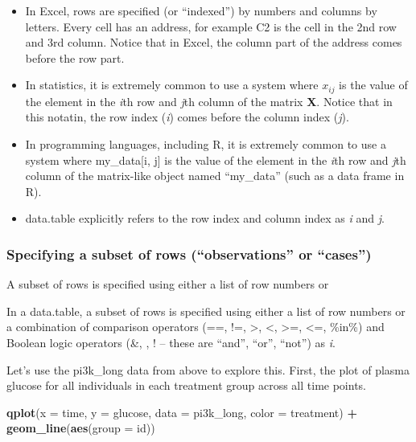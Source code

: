 \documentclass[]{book}
\newenvironment{Shaded}{\begin{snugshade}}{\end{snugshade}}
\newcommand{\DataTypeTok}[1]{\textcolor[rgb]{0.13,0.29,0.53}{#1}}
\newcommand{\KeywordTok}[1]{\textcolor[rgb]{0.13,0.29,0.53}{\textbf{#1}}}
\newcommand{\NormalTok}[1]{#1}
\newcommand{\OperatorTok}[1]{\textcolor[rgb]{0.81,0.36,0.00}{\textbf{#1}}}
\newcommand{\StringTok}[1]{\textcolor[rgb]{0.31,0.60,0.02}{#1}}
\providecommand{\tightlist}{%
  \setlength{\itemsep}{0pt}\setlength{\parskip}{0pt}}
\begin{document}
\begin{itemize}
\tightlist
\item
  In Excel, rows are specified (or ``indexed'') by numbers and columns by letters. Every cell has an address, for example C2 is the cell in the 2nd row and 3rd column. Notice that in Excel, the column part of the address comes before the row part.
\item
  In statistics, it is extremely common to use a system where \(x_{ij}\) is the value of the element in the \emph{i}th row and \emph{j}th column of the matrix \textbf{X}. Notice that in this notatin, the row index (\emph{i}) comes before the column index (\emph{j}).
\item
  In programming languages, including R, it is extremely common to use a system where my\_data{[}i, j{]} is the value of the element in the \emph{i}th row and \emph{j}th column of the matrix-like object named ``my\_data'' (such as a data frame in R).
\item
  data.table explicitly refers to the row index and column index as \emph{i} and \emph{j}.
\end{itemize}

\hypertarget{specifying-a-subset-of-rows-observations-or-cases}{%
\subsubsection{Specifying a subset of rows (``observations'' or ``cases'')}\label{specifying-a-subset-of-rows-observations-or-cases}}

A subset of rows is specified using either a list of row numbers or

In a data.table, a subset of rows is specified using either a list of row numbers or a combination of comparison operators (==, !=, \textgreater, \textless, \textgreater=, \textless=, \%in\%) and Boolean logic operators (\&, \textbar, ! -- these are ``and'', ``or'', ``not'') as \emph{i}.

Let's use the pi3k\_long data from above to explore this. First, the plot of plasma glucose for all individuals in each treatment group across all time points.

\begin{Shaded}
\begin{Highlighting}[]
\KeywordTok{qplot}\NormalTok{(}\DataTypeTok{x =}\NormalTok{ time,}
      \DataTypeTok{y =}\NormalTok{ glucose,}
      \DataTypeTok{data =}\NormalTok{ pi3k_long,}
      \DataTypeTok{color =}\NormalTok{ treatment) }\OperatorTok{+}
\StringTok{  }\KeywordTok{geom_line}\NormalTok{(}\KeywordTok{aes}\NormalTok{(}\DataTypeTok{group =}\NormalTok{ id))}
\end{Highlighting}
\end{Shaded}
\end{document}
